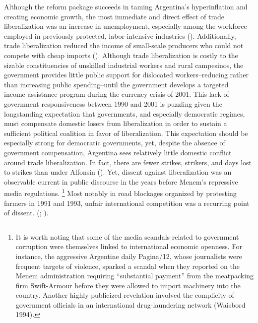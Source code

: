 \documentclass[12pt]{report}
\begin{document}
Although the reform package succeeds in taming Argentina's hyperinflation
and creating economic growth, the most immediate and direct effect
of trade liberalization was an increase in unemployment, especially
among the workforce employed in previously protected, labor-intensive
industries (\citealt[10]{Beker:2011vq}). Additionally, trade liberalization
reduced the income of small-scale producers who could not compete
with cheap imports (\citealt{eckstein2001power}). Although trade
liberalization is costly to the sizable constituencies of unskilled
industrial workers and rural campesinos, the government provides little
public support for dislocated workers--reducing rather than increasing
public spending--until the government develops a targeted income-assistance
program during the currency crisis of 2001. This lack of government
responsiveness between 1990 and 2001 is puzzling given the longstanding
expectation that governments, and especially democratic regimes, must
compensate domestic losers from liberalization in order to sustain
a sufficient political coalition in favor of liberalization. This
expectation should be especially strong for democratic governments,
yet, despite the absence of government compensation, Argentina sees
relatively little domestic conflict around trade liberalization. In
fact, there are fewer strikes, strikers, and days lost to strikes
than under Alfonsin (\citealt{eckstein2001power}). Yet, dissent against
liberalization was an observable current in public discourse in the
years before Menem's repressive media regulations.%
\footnote{It is worth noting that some of the media scandals related to government
corruption were themselves linked to international economic openness.
For instance, the aggressive Argentine daily Pagina/12, whose journalists
were frequent targets of violence, sparked a scandal when they reported
on the Menem administration requiring ``substantial payment''
from the meatpacking firm Swift-Armour before they were allowed to
import machinery into the country. Another highly publicized revelation
involved the complicity of government officials in an international
drug-laundering network (Waisbord 1994).%
} Most notably in road blockages organized by protesting farmers in
1991 and 1993, unfair international competition was a recurring point
of dissent. (\citealt{McCullough:1991cs}; \citealt{Ferber:1993fb}).
\end{document}
